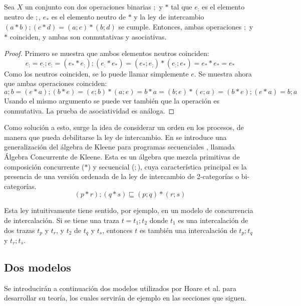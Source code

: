 \begin{thm} Sea $X$ un conjunto con dos operaciones binarias $;$ y $*$ tal que $e_;$ es el elemento neutro de $;$, $e_*$ es el elemento neutro de $*$ y la ley de intercambio $(a * b) ; (c * d) = (a ; c) * (b ; d)$ se cumple. Entonces, ambas operaciones $;$ y $*$ coinciden, y ambas son conmutativas y asociativas. 
\end{thm}
\begin{proof}
Primero se muestra que ambos elementos neutros coinciden:
\begin{equation*}
e_; = e_; ; e_; = (e_* * e_;);(e_; * e_*) = (e_* ; e_;) * (e_; ; e_*) = e_* * e_* = e_*
\end{equation*}
Como los neutros coinciden, se lo puede llamar simplemente $e$. Se muestra ahora que ambas operaciones coinciden:
\begin{equation*}
a ; b = (e * a) ; (b * e) = (e ; b) * (a ; e) = b * a = (b ; e) * (e ; a) = (b * e) ; (e * a) = b ; a
\end{equation*}
Usando el mismo argumento se puede ver también que la operación es conmutativa. La prueba de asociatividad es análoga. 
\end{proof}

Como solución a esto, surge la idea de considerar un orden en los procesos, de manera que pueda debilitarse la ley de intercambio. En \cite{hoare:2009} se introduce una generalización del álgebra de Kleene para programas secuenciales \cite{kozen:1994}, llamada Álgebra Concurrente de Kleene. Esta es un álgebra que mezcla primitivas de composición concurrente ($*$) y secuencial ($;$), cuya característica principal es la presencia de una versión ordenada de la ley de intercambio de 2-categorías o bi-categorías. 
\begin{equation*}
(p * r) ; (q * s) \sqsubseteq (p ; q) * (r ; s)
\end{equation*}

Esta ley intuitivamente tiene sentido, por ejemplo, en un modelo de concurrencia de intercalación. Si se tiene una traza $t = t_1 ; t_2$ donde $t_1$ es una intercalación de dos trazas $t_p$ y $t_r$, y $t_2$ de $t_q$ y $t_s$, entonces $t$ es también una intercalación de $t_p ; t_q$ y $t_r ; t_s$. 

\subsection{Dos modelos}\label{mc:models}
Se introducirán a continuación dos modelos utilizados por Hoare et al. \cite{hoare:2011} para desarrollar su teoría, los cuales servirán de ejemplo en las secciones que siguen.

